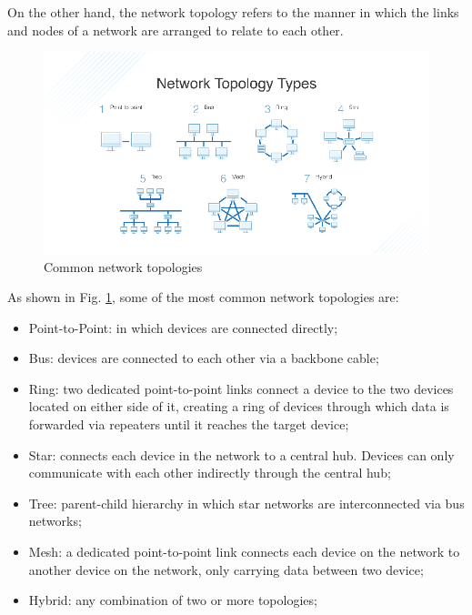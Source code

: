 		On the other hand, the network topology refers to the manner in which the links and nodes of a network are arranged to relate to each other.
		
		\begin{figure}[H]
			\centering
			\includegraphics[width=\textwidth]{resources/img/chap3/network_topologies.png}
			\caption{Common network topologies}
			\label{img:network_topologies}
		\end{figure}
		
		As shown in Fig. \ref{img:network_topologies}, some of the most common network topologies are:
		\begin{itemize}[noitemsep]
			\item Point-to-Point: in which devices are connected directly;
			\item Bus: devices are connected to each other via a backbone cable;
			\item Ring: two dedicated point-to-point links connect a device to the two devices located on either side of it, creating a ring of devices through which data is forwarded via repeaters until it reaches the target device;
			\item Star: connects each device in the network to a central hub. Devices can only communicate with each other indirectly through the central hub;
			\item Tree: parent-child hierarchy in which star networks are interconnected via bus networks;
			\item Mesh: a dedicated point-to-point link connects each device on the network to another device on the network, only carrying data between two device;
			\item Hybrid: any combination of two or more topologies;
		\end{itemize}
	
